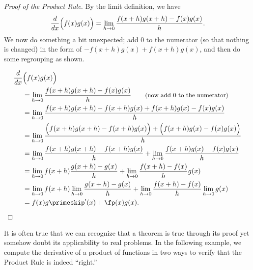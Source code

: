 \begin{proof}[Proof of the Product Rule]
By the limit definition, we have 
\[\frac{d}{dx}\Bigl(f(x)g(x)\Bigr) =\lim_{h\to0} \frac{f(x+h)g(x+h)-f(x)g(x)}{h}.\]
We now do something a bit unexpected; add 0 to the numerator (so that nothing is changed) in the form of $-f(x+h)g(x)+f(x+h)g(x)$, and then do some regrouping as shown.

\begin{align*}
	\dfrac{d}{dx}&\Bigl(f(x)g(x)\Bigr) \\
	&=\lim_{h\to0} \frac{f(x+h)g(x+h)-f(x)g(x)}{h}
	\qquad\text{\small(now add 0 to the numerator)}\\
	&=\lim_{h\to0} \frac{f(x+h)g(x+h)-f(x+h)g(x)+f(x+h)g(x)-f(x)g(x)}{h} \\
	&=\lim_{h\to0} \frac{\Bigl(f(x+h)g(x+h)-f(x+h)g(x)\Bigr)+\Bigl(f(x+h)g(x)-f(x)g(x)\Bigr)}{h} \\
	&=\lim_{h\to0} \frac{f(x+h)g(x+h)-f(x+h)g(x)}{h}+\lim_{h\to0}\frac{f(x+h)g(x)-f(x)g(x)}{h} \\ %
	&=\lim_{h\to0} f(x+h)\frac{g(x+h)-g(x)}{h}+\lim_{h\to0}\frac{f(x+h)-f(x)}{h}g(x) \\ %
	&=\lim_{h\to0} f(x+h)\lim_{h\to0}\frac{g(x+h)-g(x)}{h}+\lim_{h\to0}\frac{f(x+h)-f(x)}{h}\lim_{h\to0}g(x) \\ %
	&=f(x)g\primeskip'(x) + \fp(x)g(x).\qedhere
\end{align*}
\end{proof}

It is often true that we can recognize that a theorem is true through its proof yet somehow doubt its applicability to real problems. In the following example, we compute the derivative of a product of functions in two ways to verify that the Product Rule is indeed ``right.''

